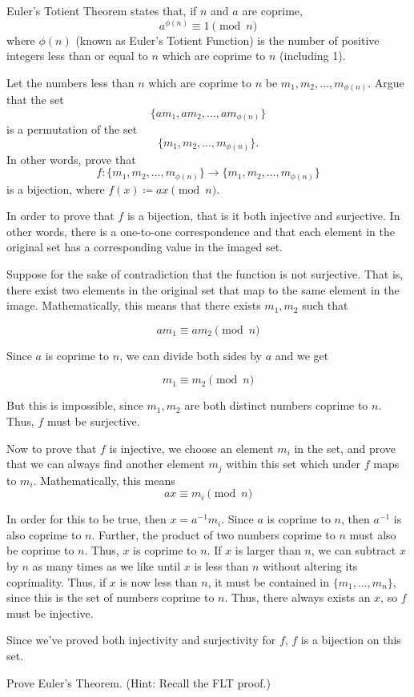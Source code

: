 \documentclass[11pt]{article}
\begin{document}
\pagebreak
{}Euler's Totient Theorem states that, if $n$ and $a$ are coprime,
\[
  a^{\phi(n)} \equiv 1 \pmod{n}
\]
where $\phi(n)$ (known as Euler's Totient Function) is the number of positive
integers less than or equal to $n$ which are coprime to $n$ (including 1).

\begin{Parts}
  \Part Let the numbers less than $n$ which are coprime to $n$ be $m_1, m_2, \ldots, m_{\phi(n)}$. 
  Argue that the set
  \[\{am_1, am_2, \ldots, am_{\phi(n)}\}\]
  is a permutation of the set
  \[\{m_1, m_2, \ldots, m_{\phi(n)}\}.\]
  In other words, prove that 
  \[f:\{m_1, m_2, \ldots, m_{\phi(n)}\} \to \{m_1, m_2, \ldots, m_{\phi(n)}\}\]
  is a bijection, where $f(x) \coloneqq ax \pmod{n}$.


  \begin{solution}
    In order to prove that $f$ is a bijection, that is it both injective and surjective. In other words, there is a one-to-one correspondence and that each element in the original set has a corresponding value in the imaged set.

    Suppose for the sake of contradiction that the function is not surjective. That is, there exist two elements in the original set that map to the same element in the image. Mathematically, this means that there exists $m_1, m_2$ such that 

    \[ am_1 \equiv am_2 \pmod n\]
    
    Since $a$ is coprime to $n$, we can divide both sides by $a$ and we get
    
    \[ m_1 \equiv m_2 \pmod n\]

    But this is impossible, since $m_1, m_2$ are both distinct numbers coprime to $n$. Thus, $f$ must be surjective. 

    Now to prove that $f$ is injective, we choose an element $m_i$ in the set, and prove that we can always find another element $m_j$ within this set which under $f$ maps to $m_i$. Mathematically, this means 
    \[ ax \equiv m_i \pmod n\]
    
    In order for this to be true, then $x = a^{-1}m_i$. Since $a$ is coprime to $n$, then $a^{-1}$ is also coprime to $n$. Further, the product of two numbers coprime to $n$ must also be coprime to $n$. Thus, $x$ is coprime to $n$. If $x$ is larger than $n$, we can subtract $x$ by $n$ as many times as we like until $x$ is less than $n$ without altering its coprimality. Thus, if $x$ is now less than $n$, it must be contained in $\{m_1, \dots, m_n\}$, since this is the set of numbers coprime to $n$. Thus, there always exists an $x$, so $f$ must be injective.

    Since we've proved both injectivity and surjectivity for $f$, $f$ is a bijection on this set.
  \end{solution}

  \Part Prove Euler's Theorem. (Hint: Recall the FLT proof.)

  \begin{solution}
    
  \end{solution}


\end{Parts}
\end{document}
